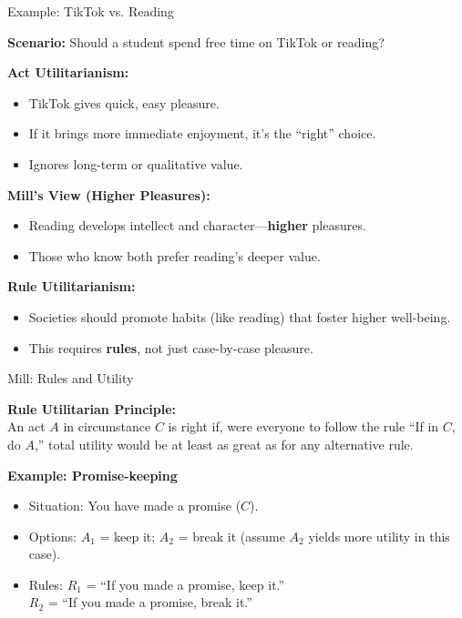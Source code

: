 \documentclass[aspectratio=169, 10pt]{beamer}
\begin{document}
\begin{frame}{Example: TikTok vs. Reading}

\textbf{Scenario:} Should a student spend free time on TikTok or reading?

\vspace{0.5em}
\textbf{Act Utilitarianism:}
\begin{itemize}
    \item TikTok gives quick, easy pleasure.
    \item If it brings more immediate enjoyment, it’s the “right” choice.
    \item Ignores long-term or qualitative value.
\end{itemize}

\vspace{0.5em}
\textbf{Mill’s View (Higher Pleasures):}
\begin{itemize}
    \item Reading develops intellect and character—\textbf{higher} pleasures.
    \item Those who know both prefer reading’s deeper value.
\end{itemize}

\vspace{0.5em}
\textbf{Rule Utilitarianism:}
\begin{itemize}
    \item Societies should promote habits (like reading) that foster higher well-being.
    \item This requires \textbf{rules}, not just case-by-case pleasure.
\end{itemize}

\end{frame}

\begin{frame}{Mill: Rules and Utility}

\textbf{Rule Utilitarian Principle:} \\
An act \(A\) in circumstance \(C\) is right if, were everyone to follow the rule “If in \(C\), do \(A\),” total utility would be at least as great as for any alternative rule.

\vspace{0.5em}
\textbf{Example: Promise-keeping}
\begin{itemize}
    \item Situation: You have made a promise (\(C\)).
    \item Options: \(A_1\) = keep it; \(A_2\) = break it (assume \(A_2\) yields more utility in this case).
    \item  Rules: \(R_1\) = “If you made a promise, keep it.” \\
    \phantom{Rules: } \(R_2\) = “If you made a promise, break it.”
\end{itemize}


\end{frame}
\end{document}
